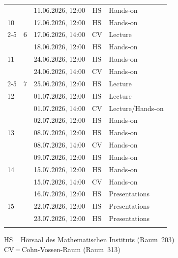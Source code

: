 \documentclass[a4paper]{article}
\newcommand{\lec}{\cellcolor{lecturecolor}Lecture}
\newcommand{\hon}{\cellcolor{handsoncolor}Hands-on}
\newcommand{\lecthon}{\cellcolor{lecturecolor}Lecture/Hands-on}
\newcommand{\pres}{\cellcolor{presentationcolor}Presentations}
\newlength{\ruleextra}
\newcommand{\widebottomrule}{\noalign{\vskip\aboverulesep\moveleft\ruleextra\vbox{\hrule width\dimexpr\linewidth+2\ruleextra\relax height\heavyrulewidth}\vskip\belowbottomsep}}
\begin{document}
\begin{table}[ht]
\begin{tabular*}{\textwidth}{@{} l @{\hspace{0.8em}} c @{\extracolsep{\fill}} c @{\hspace{1em}} c l @{}}
\cellcolor{weekB}    &   & 11.06.2026, 12:00 & HS & \hon \\
\cellcolor{weekA} 10 &   & 17.06.2026, 12:00 & HS & \hon \\
\cmidrule(l){2-5}
\cellcolor{weekA}    & 6 & 17.06.2026, 14:00 & CV & \lec \\
\cellcolor{weekA}    &   & 18.06.2026, 12:00 & HS & \hon \\
\cellcolor{weekB} 11 &   & 24.06.2026, 12:00 & HS & \hon \\
\cellcolor{weekB}    &   & 24.06.2026, 14:00 & CV & \hon \\
\cmidrule(l){2-5}
\cellcolor{weekB}    & 7 & 25.06.2026, 12:00 & HS & \lec \\
\cellcolor{weekA} 12 &   & 01.07.2026, 12:00 & HS & \lec \\
\cellcolor{weekA}    &   & 01.07.2026, 14:00 & CV & \lecthon \\
\cellcolor{weekA}    &   & 02.07.2026, 12:00 & HS & \hon \\
\cellcolor{weekB} 13 &   & 08.07.2026, 12:00 & HS & \hon \\
\cellcolor{weekB}    &   & 08.07.2026, 14:00 & CV & \hon \\
\cellcolor{weekB}    &   & 09.07.2026, 12:00 & HS & \hon \\
\cellcolor{weekA} 14 &   & 15.07.2026, 12:00 & HS & \hon \\
\cellcolor{weekA}    &   & 15.07.2026, 14:00 & CV & \hon \\
\cellcolor{weekA}    &   & 16.07.2026, 12:00 & HS & \pres \\
\cellcolor{weekB} 15 &   & 22.07.2026, 12:00 & HS & \pres \\
\cellcolor{weekB}    &   & 23.07.2026, 12:00 & HS & \pres \\
\widebottomrule
\end{tabular*}
\end{table}

\smallskip\noindent\small
HS\,=\,H\"orsaal des Mathematischen Instituts (Raum~203)\\
CV\,=\,Cohn-Vossen-Raum (Raum~313)
\end{document}
